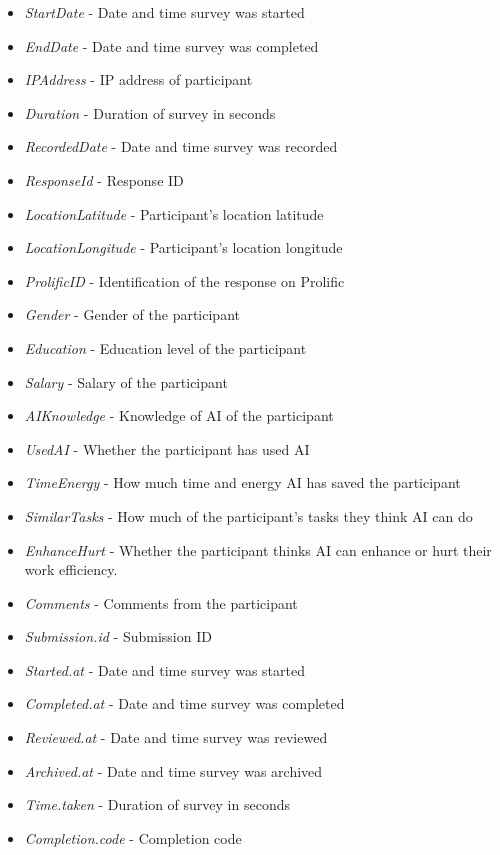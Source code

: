 \documentclass[
]{article}
\begin{document}
\begin{itemize}
\item
  \emph{StartDate} - Date and time survey was started
\item
  \emph{EndDate} - Date and time survey was completed
\item
  \emph{IPAddress} - IP address of participant
\item
  \emph{Duration} - Duration of survey in seconds
\item
  \emph{RecordedDate} - Date and time survey was recorded
\item
  \emph{ResponseId} - Response ID
\item
  \emph{LocationLatitude} - Participant's location latitude
\item
  \emph{LocationLongitude} - Participant's location longitude
\item
  \emph{ProlificID} - Identification of the response on Prolific
\item
  \emph{Gender} - Gender of the participant
\item
  \emph{Education} - Education level of the participant
\item
  \emph{Salary} - Salary of the participant
\item
  \emph{AIKnowledge} - Knowledge of AI of the participant
\item
  \emph{UsedAI} - Whether the participant has used AI
\item
  \emph{TimeEnergy} - How much time and energy AI has saved the
  participant
\item
  \emph{SimilarTasks} - How much of the participant's tasks they think
  AI can do
\item
  \emph{EnhanceHurt} - Whether the participant thinks AI can enhance or
  hurt their work efficiency.
\item
  \emph{Comments} - Comments from the participant
\item
  \emph{Submission.id} - Submission ID
\item
  \emph{Started.at} - Date and time survey was started
\item
  \emph{Completed.at} - Date and time survey was completed
\item
  \emph{Reviewed.at} - Date and time survey was reviewed
\item
  \emph{Archived.at} - Date and time survey was archived
\item
  \emph{Time.taken} - Duration of survey in seconds
\item
  \emph{Completion.code} - Completion code

\end{itemize}
\end{document}
